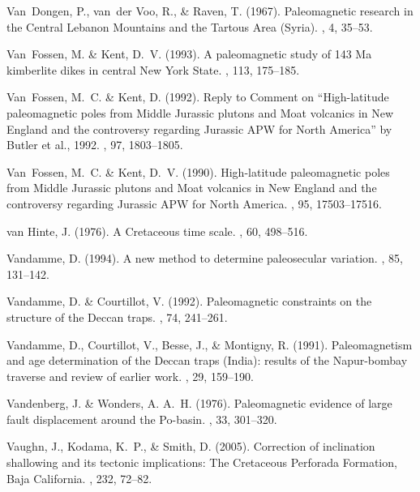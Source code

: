 Van~Dongen, P., van~der Voo, R., \& Raven, T. (1967).
\newblock Paleomagnetic research in the Central Lebanon Mountains and the
  Tartous Area (Syria).
, 4, 35--53.

Van~Fossen, M. \& Kent, D.~V. (1993).
\newblock A paleomagnetic study of 143 Ma kimberlite dikes in central New York
  State.
, 113, 175--185.

Van~Fossen, M.~C. \& Kent, D. (1992).
\newblock Reply to Comment on ``High-latitude paleomagnetic poles from Middle
  Jurassic plutons and Moat volcanics in New England and the controversy
  regarding Jurassic {APW} for North America'' by Butler et al., 1992.
, 97, 1803--1805.

Van~Fossen, M.~C. \& Kent, D.~V. (1990).
\newblock High-latitude paleomagnetic poles from Middle Jurassic plutons and
  Moat volcanics in New England and the controversy regarding Jurassic {APW}
  for North America.
, 95, 17503--17516.

van Hinte, J. (1976).
\newblock A Cretaceous time scale.
, 60, 498--516.

Vandamme, D. (1994).
\newblock A new method to determine paleosecular variation.
, 85, 131--142.

Vandamme, D. \& Courtillot, V. (1992).
\newblock Paleomagnetic constraints on the structure of the Deccan traps.
, 74, 241--261.

Vandamme, D., Courtillot, V., Besse, J., \& Montigny, R. (1991).
\newblock Paleomagnetism and age determination of the Deccan traps (India):
  results of the Napur-bombay traverse and review of earlier work.
, 29, 159--190.

Vandenberg, J. \& Wonders, A. A.~H. (1976).
\newblock Paleomagnetic evidence of large fault displacement around the
  Po-basin.
, 33, 301--320.

Vaughn, J., Kodama, K.~P., \& Smith, D. (2005).
\newblock Correction of inclination shallowing and its tectonic implications:
  The Cretaceous Perforada Formation, Baja California.
, 232, 72--82.

